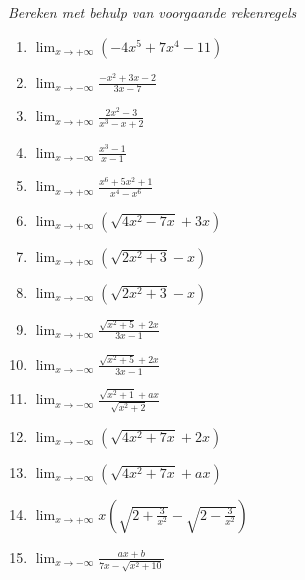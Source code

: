\documentclass{ximera}
\begin{document}
\begin{exercise}
	\textit{Bereken met behulp van voorgaande rekenregels}
	\begin{enumerate}
		\renewcommand{\labelenumi}{(\alph{enumi})}
		\item $\displaystyle{\lim_{x \rightarrow + \infty}} (-4x^5 + 7x^4 -
		11)$
		\item $\displaystyle{\lim_{x \rightarrow - \infty}} \frac{-x^2 + 3x
			- 2}{3x-7}$
		\item $\displaystyle{\lim_{x \rightarrow + \infty}} \frac{2x^2 -
			3}{x^3 - x + 2}$
		\item $\displaystyle{\lim_{x \rightarrow - \infty}} \frac{x^3 -
			1}{x - 1}$
		\item $\displaystyle{\lim_{x \rightarrow + \infty}} \frac{x^6 +
			5x^2 + 1}{x^4 - x^6}$
		\item $\displaystyle{\lim_{x \rightarrow + \infty}} (\sqrt{4x^2 - 7x} + 3x)$
		\item $\displaystyle{\lim_{x \rightarrow + \infty}} (\sqrt{2 x^2 + 3} - x)$
		\item $\displaystyle{\lim_{x \rightarrow - \infty}} (\sqrt{2 x^2 + 3} - x)$
		\item $\displaystyle{\lim_{x \rightarrow + \infty}} \frac{\sqrt{x^2 + 5} + 2x}{3x-1}$
		\item $\displaystyle{\lim_{x \rightarrow - \infty}} \frac{\sqrt{x^2 + 5} + 2x}{3x-1}$
		\item $\displaystyle{\lim_{x \rightarrow - \infty}} \frac{\sqrt{x^2+1} + ax}{\sqrt{x^2+2}}$
		\item $\displaystyle{\lim_{x \rightarrow - \infty}} (\sqrt{4x^2 + 7x} +
		2x)$  
		\item $\displaystyle{\lim_{x \rightarrow - \infty}} (\sqrt{4x^2 + 7x} +
		ax)$  
		\item $\displaystyle{\lim_{x \rightarrow + \infty}} x(\sqrt{2+ \frac{3}{x^2}} - \sqrt{2- \frac{3}{x^2}})$
		\item $\displaystyle{\lim_{x \rightarrow - \infty}} \frac{ax + b}{7x- \sqrt{x^2 + 10}}$
	\end{enumerate}
\begin{comment}  %
	\begin{oplossing}
		\begin{enumerate}
			\renewcommand{\labelenumi}{(\alph{enumi})}
			\item $\displaystyle{\lim_{x \rightarrow + \infty}} (-4x^5 + 7x^4 -	11) = - \infty$
			\item $\displaystyle{\lim_{x \rightarrow - \infty}} \frac{-x^2 + 3x	- 2}{3x-7} = + \infty$

\end{comment}
\end{exercise}
\end{document}
